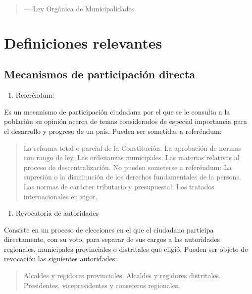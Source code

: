 \documentclass[
]{book}
\providecommand{\tightlist}{%
  \setlength{\itemsep}{0pt}\setlength{\parskip}{0pt}}
\begin{document}
\begin{quote}
--- Ley Orgánica de Municipalidades
\end{quote}

\hypertarget{definiciones-relevantes}{%
\section{Definiciones relevantes}\label{definiciones-relevantes}}

\hypertarget{mecanismos-de-participaciuxf3n-directa}{%
\subsection{Mecanismos de participación directa}\label{mecanismos-de-participaciuxf3n-directa}}

\begin{enumerate}
\def\labelenumi{\arabic{enumi}.}
\tightlist
\item
  Referéndum:
\end{enumerate}

Es un mecanismo de participación ciudadana por el que se le consulta a la población su opinión
acerca de temas considerados de especial importancia para el desarrollo y progreso de un país.
Pueden ser sometidas a referéndum:

\begin{quote}
La reforma total o parcial de la Constitución.
La aprobación de normas con rango de ley.
Las ordenanzas municipales.
Las materias relativas al proceso de descentralización.
No pueden someterse a referéndum:
La supresión o la disminución de los derechos fundamentales de la persona.
Las normas de carácter tributario y presupuestal.
Los tratados internacionales en vigor.
\end{quote}

\begin{enumerate}
\def\labelenumi{\arabic{enumi}.}
\setcounter{enumi}{1}
\tightlist
\item
  Revocatoria de autoridades
\end{enumerate}

Consiste en un proceso de elecciones en el que el ciudadano participa directamente, con su voto, para separar de sus cargos a las autoridades regionales, municipales provinciales o distritales que eligió.
Pueden ser objeto de revocación las siguientes autoridades:

\begin{quote}
Alcaldes y regidores provinciales.
Alcaldes y regidores distritales.
Presidentes, vicepresidentes y consejeros regionales.
\end{quote}
\end{document}
